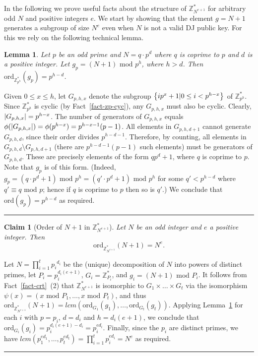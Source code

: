\documentclass[11pt]{article}
\newtheorem{lemma}[theorem]{Lemma}
\newtheorem{claim}[theorem]{Claim}
\newenvironment{proof}{\noindent {\bf Proof:} \hspace{.677em}}%
                     {\qed}
\newcommand{\qed}{\hspace*{\fill}\rule{0.6em}{0.6em}}
\newcommand{\U}[1]{\mathbb{Z}_{#1}^*}
\newcommand{\mathify}[1]{\ifmmode{#1}\else\mbox{$#1$}\fi}
\newcommand{\set}[2][]{\mathify{{\left\{#2\right\}}^{#1}}}
\newcommand{\condset}[2]{\set{#1|#2}}
\newcommand{\opbrange}[3][,]{#2#1\ldots#1#3}
\newcommand{\size}[1]{\mathify{\left| #1 \right|}}
\newcommand{\order}{{\mathrm{ord}}}
\renewcommand{\mod}{{\,\,\mathrm{mod}\,\,}}
\begin{document}
In the following we prove useful facts about the structure of
$\U{N^{e+1}}$ for arbitrary odd $N$ and positive integers $e$. We
start by showing that the element $g=N+1$ generates a subgroup of
size $N^e$ even when $N$ is not a valid DJ public key. For this we
rely on the following technical lemma.
\begin{lemma}
\label{lem-order-g-zp} Let $p$ be an odd prime and $N=q\cdot p^d$
where $q$ is coprime to $p$ and $d$ is a positive integer. Let
$g_p=(N+1)\mod p^h$, where $h>d$. Then
$\order_{\U{p^h}}(g_p)=p^{h-d}$.
\end{lemma}
\begin{proof}
Given $0\leq x\leq h$, let $G_{p,h,x}$ denote the subgroup
$\condset{ip^x+1}{0\leq i<p^{h-x}}$ of $\U{p^h}$. Since $\U{p^h}$ is
cyclic (by Fact~\ref{fact-zp-cyc}), any $G_{p,h,x}$ must also be
cyclic. Clearly, $\size{G_{p,h,x}}=p^{h-x}$. The number of
generators of $G_{p,h,x}$ equals
$\phi(\size{G_{p,h,x}})=\phi(p^{h-x})=p^{h-x-1}(p-1)$. All elements
in $G_{p,h,d+1}$ cannot generate $G_{p,h,d}$, since their order
divides $p^{h-d-1}$. Therefore, by counting, all elements in
$G_{p,h,d}\setminus G_{p,h,d+1}$ (there are $p^{h-d-1}(p-1)$ such
elements) must be generators of $G_{p,h,d}$. These are precisely
elements of the form $qp^d+1$, where $q$ is coprime to $p$. Note
that $g_p$ is of this form. (Indeed, $g_p=(q\cdot p^d+1)\mod
p^h=(q'\cdot p^d+1)\mod p^h$ for some $q'<p^{h-d}$ where $q'\equiv q
\mod p$; hence if $q$ is coprime to $p$ then so is $q'$.) We
conclude that $\order(g_p)=p^{h-d}$ as required.
\end{proof}

\begin{claim}[Order of $N+1$ in $\U{N^{e+1}}$]
\label{clm-order-g} Let $N$ be an odd integer and $e$ a positive
integer. Then \[ \order_{\U{N^{e+1}}}(N+1)=N^e. \]
\end{claim}
\begin{proof}
Let $N=\prod^t_{i=1}{p_i}^{d_i}$ be the (unique) decomposition of $N$
into powers of distinct primes, let $P_i=p^{d_i(e+1)}_i$,
$G_i=\U{P_i}$, and $g_i=(N+1)\mod P_i$. It follows from
Fact~\ref{fact-crt}~(2) that $\U{N^{e+1}}$ is isomorphic to
$\opbrange[\times]{G_1}{G_t}$ via the isomorphism $\psi(x)=(x\mod
P_1,\ldots,x\mod P_t)$, and thus
$\order_{\U{N^{e+1}}}(N+1)=lcm(\opbrange{\order_{G_1}(g_1)}{\order_{G_t}(g_t)})$.
Applying Lemma~\ref{lem-order-g-zp} for each $i$ with $p=p_i$,
$d=d_i$ and $h=d_i(e+1)$, we conclude that
$\order_{G_i}(g_i)=p^{d_i(e+1)-d_i}_i=p^{ed_i}_i$. Finally, since the
$p_i$ are distinct primes, we have
$lcm(\opbrange{p^{ed_1}_1}{p^{ed_t}_t})=\prod_{i=1}^tp_i^{ed_i}=N^e$
as required.
\end{proof}
\end{document}
